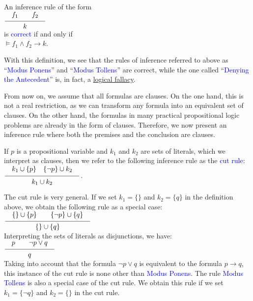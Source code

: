 \begin{Definition}
  An inference rule of the form \\[0.2cm]
  \hspace*{1.3cm} $\schluss{f_1 \qquad f_2}{k}$ \\[0.2cm]
  is \textcolor{blue}{correct} if and only if 
  \\[0.2cm]
  \hspace*{1.3cm}
  $\models f_1 \wedge f_2 \rightarrow k$. \eox
  \\[0.2cm]\mbox{}


\end{Definition}
With this definition, we see that
the rules of inference referred to above as ``\textcolor{blue}{Modus Ponens}'' and ``\textcolor{blue}{Modus Tollens}''
are correct, while the one called ``\textcolor{blue}{Denying the Antecedent}''
is, in fact, a \href{https://en.wikipedia.org/wiki/List_of_fallacies}{logical fallacy}.

From now on, we assume that all formulas are clauses. On the one hand, this is
not a real restriction, as we can transform any formula into an equivalent set of
clauses. On the other hand, the formulas in many practical propositional
logic problems are already in the form of clauses. Therefore, we now present an inference rule where
both the premises and the conclusion are clauses.
     
\begin{Definition}
    If $p$ is a propositional variable and $k_1$ and $k_2$ are sets of literals,
    which we interpret as clauses, then we refer to the following inference rule
    as the \textcolor{blue}{cut rule}: 
    \\[0.2cm]
    \hspace*{1.3cm}
    $\ds \schluss{ k_1 \cup \{p\} \quad \{\neg p\} \cup k_2 }{k_1 \cup k_2}$. 
    \eox
\end{Definition}

The cut rule is very general. If we set $k_1 = \{\}$ and $k_2 = \{q\}$ in the definition above,
we obtain the following rule as a special case: \\[0.2cm]
\hspace*{1.3cm} $\schluss{\{\} \cup \{p\} \quad\quad \{\neg p\} \cup \{ q \} }{ \{\} \cup \{q\} }$ \\[0.2cm]
Interpreting the sets of literals as disjunctions, we have: \\[0.2cm]
\hspace*{1.3cm}  $\schluss{p \quad\quad \neg p \vee q }{ q }$ \\[0.2cm]
Taking into account that the formula $\neg p \vee q$ is equivalent to the
formula $p \rightarrow q$, this instance of the cut rule is none other than \textcolor{blue}{Modus Ponens}.
The rule \textcolor{blue}{Modus Tollens} is also a special case of the cut rule. We
obtain this rule if we set $k_1 = \{ \neg q \}$ and $k_2 = \{\}$ in the cut rule.

